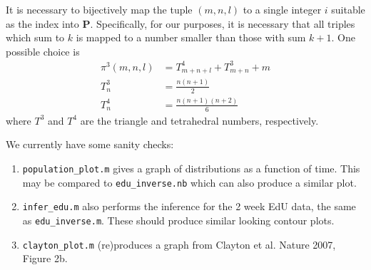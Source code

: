 \documentclass[10pt,english]{article}
\begin{document}
It is necessary to bijectively map the tuple $(m,n,l)$ to a single integer $i$ suitable as the index into $\mathbf P$. Specifically, for our purposes, it is necessary that all triples which sum to $k$ is mapped to a number smaller than those with sum $k+1$. One possible choice is \begin{align*}
\pi^3(m,n,l) &= T^4_{m+n+l} + T^3_{m+n} + m \\
T^3_n &= \frac{n(n+1)}{2} \\
T^4_n &= \frac{n(n+1)(n+2)}{6}
\end{align*}
where $T^3$ and $T^4$ are the triangle and tetrahedral numbers, respectively.

We currently have some sanity checks:
\begin{enumerate}
\item {\tt population\_plot.m} gives a graph of distributions as a function of time. This may be compared to {\tt edu\_inverse.nb} which can also produce a similar plot.

\item {\tt infer\_edu.m} also performs the inference for the 2 week EdU data, the same as {\tt edu\_inverse.m}. These should produce similar looking contour plots.

\item {\tt clayton\_plot.m} (re)produces a graph from Clayton et al. Nature 2007, Figure 2b.
\end{enumerate}
\end{document}

